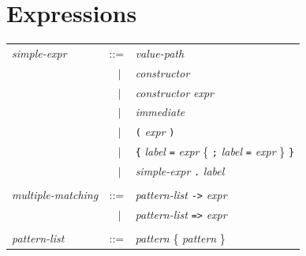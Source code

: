 \documentclass[11pt,titlepage,twoside]{report}
\newcommand{\alt}{\;|\;}
\newcommand{\Minusgreater}{\mbox{{\tt ->}}}
\newcommand{\Equalgreater}{\mbox{{\tt =>}}}
\newcommand{\term}[1]{{\tt #1}}
\newcommand{\nterm}[1]{{\em #1}}
\begin{document}
\section{Expressions}
\label{expressions}
\begin{center}
\begin{tabular}{lcl}
\nterm{simple-expr}
  & ::=        & \nterm{value-path} \\
  & $\;\;\alt$ & \nterm{constructor} \\
  & $\;\;\alt$ & \nterm{constructor} \nterm{expr} \\
  & $\;\;\alt$ & \nterm{immediate} \\
  & $\;\;\alt$ & \term{(} \nterm{expr} \term{)} \\
  & $\;\;\alt$ & \term{\{} \nterm{label} \term{=} \nterm{expr}
                 \{ \term{;} \nterm{label} \term{=} \nterm{expr} \} 
                 \term{\}} \\
  & $\;\;\alt$ & \nterm{simple-expr} \term{.} \nterm{label}
\\ \\
\nterm{multiple-matching}
   & ::=        & \nterm{pattern-list} \term{\Minusgreater} \nterm{expr} \\
   & $\;\;\alt$ & \nterm{pattern-list} \term{\Equalgreater} \nterm{expr} 
\\ \\
\nterm{pattern-list}           
   & ::=        & \nterm{pattern} \{ \nterm{pattern} \}
\end{tabular}
\end{center}
\end{document}
